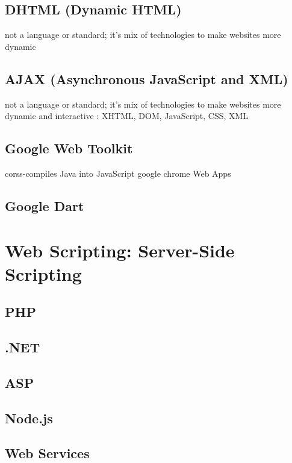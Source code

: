 \documentclass{myproc}
\begin{document}
\subsection{DHTML (Dynamic HTML)}
\bit
\w not a language or standard; it's mix of technologies to make websites more
dynamic 
\eit

\subsection{AJAX (Asynchronous JavaScript and XML)}
\bit
\w not a language or standard; it's mix of technologies to make websites more
dynamic and interactive
\w {}
\w {}: XHTML, DOM, JavaScript, CSS, XML
\eit

\subsection{Google Web Toolkit}
\bit
\w corss-compiles Java into JavaScript 
\w google chrome Web Apps
\eit
\subsection{Google Dart}

\section{Web Scripting: Server-Side Scripting}
\subsection{PHP}
\subsection{.NET}
\subsection{ASP}
\subsection{Node.js}
\subsection{Web Services}


\end{document}

